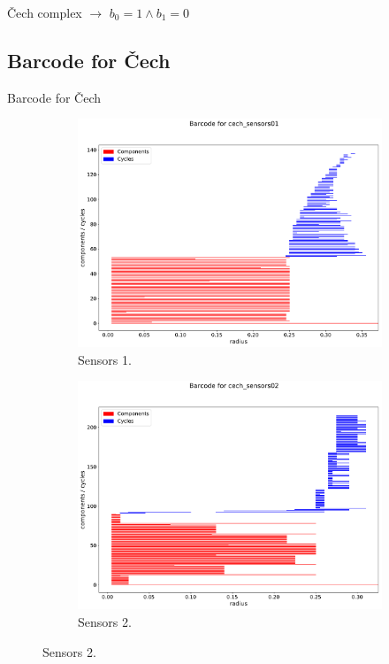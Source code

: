 \documentclass{beamer}
\begin{document}
\begin{frame}{Čech complex $\longrightarrow$ $b_0 = 1 \wedge b_1 = 0$}
\begin{figure}[!ht]
\end{figure}
\end{frame}

\subsection{Barcode for Čech}

\begin{frame}{Barcode for Čech}

\begin{figure}[!ht]
\centering
\begin{subfigure}{.5\textwidth}
	\centering
	\includegraphics[scale=0.19]{used_images/barcode_cech_sensors01.pdf}
	\caption{Sensors 1.}
\end{subfigure}%
\begin{subfigure}{.5\textwidth}
	\centering
	\includegraphics[scale=0.19]{used_images/barcode_cech_sensors02.pdf}
	\caption{Sensors 2.}
\end{subfigure}%

\end{figure}
\end{frame}
\end{document}
